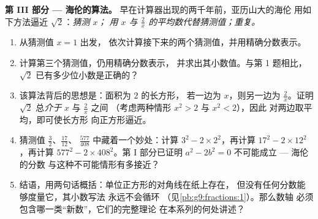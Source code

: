 \begin{problem}
\medskip
\noindent\textbf{第 III 部分 --- 海伦的算法。}
早在计算器出现的两千年前，亚历山大的海伦
用如下方法逼近 $\sqrt2$：\emph{猜测 $x$；
用 $x$ 与 $\frac2x$ 的平均数代替猜测值；重复。}
\begin{enumerate}[resume]
  \item 从猜测值 $x = 1$ 出发，
        依次计算接下来的两个猜测值，并用精确分数表示。
  \item 计算第三个猜测值，仍用精确分数表示，
        并求出其小数值。与第 1 题相比，
        $\sqrt2$ 已有多少位小数是正确的？
  \item 该算法背后的思想是：面积为 $2$ 的长方形，
        若一边为 $x$，则另一边为 $\frac2x$。证明
        $\sqrt2$ 总\emph{介于} $x$ 与 $\frac2x$ 之间
        （考虑两种情形 $x^2 > 2$ 与 $x^2 < 2$），因此
        对两边取平均，即可使长方形
        向正方形逼近。
  \item 猜测值 $\frac32$、$\frac{17}{12}$、
        $\frac{577}{408}$ 中藏着一个妙处：计算 $3^2 - 2 \times
        2^2$，再计算 $17^2 - 2 \times 12^2$，再计算
        $577^2 - 2 \times 408^2$。第 I 部分已证明
        $a^2 - 2b^2 = 0$ 不可能成立 --- 海伦的分数
        与这种不可能情形有多接近？
  \item 结语，用两句话概括：单位正方形的对角线在纸上存在，
        但没有任何分数能够度量它，其小数写法
        永远不会循环
        （见\cref{pb:g9:fractions:1}）。那么数轴
        必须包含哪一类“新数”，它们的完整理论
        在本系列的何处讲述？
\end{enumerate}
\end{problem}
